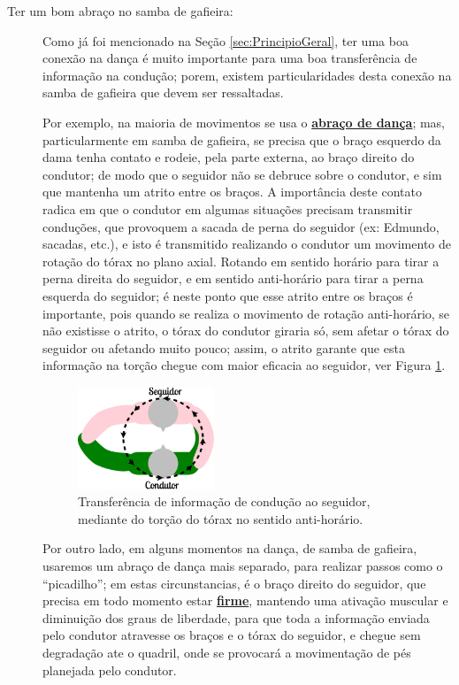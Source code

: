 \begin{description}
\item[Ter um bom abraço no samba de gafieira:] Como já foi mencionado na Seção \ref{sec:PrincipioGeral}, 
ter uma boa conexão na dança é muito importante para uma boa transferência de informação na condução; 
porem, existem particularidades desta conexão na samba de gafieira que devem ser ressaltadas.

Por exemplo, na maioria de movimentos se usa o \hyperref[def:abracodedanca]{\textbf{abraço de dança}};
mas, particularmente em samba de gafieira, se precisa que o braço esquerdo da dama tenha contato
e rodeie, pela parte externa, ao braço direito do condutor; 
de modo  que o seguidor não se debruce sobre o condutor,
e sim que mantenha um atrito entre os braços.
A importância deste contato radica em que o condutor em algumas situações precisam transmitir conduções, 
que provoquem a sacada de perna do seguidor (ex: Edmundo, sacadas, etc.), 
e isto é transmitido realizando o condutor um movimento de rotação do tórax no plano axial.  
Rotando em sentido horário para tirar a perna direita do seguidor, 
e em sentido anti-horário para tirar a perna esquerda do seguidor;
é neste ponto que esse atrito entre os braços é importante, 
pois quando se realiza o movimento de rotação anti-horário, se não existisse o atrito,
o tórax do condutor giraria só, sem afetar o tórax do seguidor ou afetando muito pouco;
assim, o atrito garante que esta informação na torção chegue com maior eficacia ao seguidor,
ver Figura \ref{fig:torcao-abraco}.
\begin{figure}[h]
  \centering
    \includegraphics[width=0.4\textwidth]{chapters/cap-normas/torcao-abraco.eps}
\caption{Transferência de informação de condução ao seguidor, mediante do torção do tórax no sentido anti-horário.}
\label{fig:torcao-abraco}
\end{figure}

Por outro lado, em alguns momentos na dança, de samba de gafieira, usaremos um abraço de dança mais separado,
para realizar passos como o ``picadilho''; em estas circunstancias, é o braço direito do seguidor,
que precisa em todo momento estar \hyperref[def:brazosfirmes]{\textbf{firme}}, 
mantendo uma ativação muscular e diminuição dos graus de liberdade,
para que toda a informação enviada pelo condutor atravesse os braços e o tórax do seguidor,
e chegue sem degradação ate o quadril, onde se provocará a movimentação de pés planejada pelo condutor.


\end{description}
